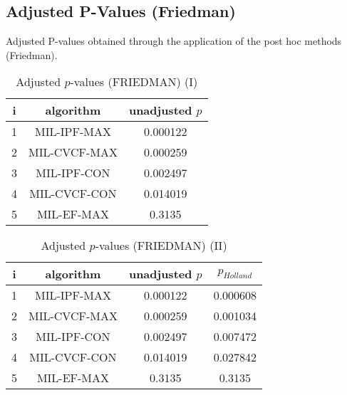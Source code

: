 \documentclass[a4paper,10pt]{article}
\begin{document}
\begin{landscape}
\newpage

\section{Adjusted P-Values (Friedman)}


Adjusted P-values obtained through the application of the post hoc methods (Friedman).

\begin{table}[!htp]
\centering\small
\begin{tabular}{ccc}
i&algorithm&unadjusted $p$\\
\hline1&MIL-IPF-MAX&0.000122\\2&MIL-CVCF-MAX&0.000259\\3&MIL-IPF-CON&0.002497\\4&MIL-CVCF-CON&0.014019\\5&MIL-EF-MAX&0.3135\\\hline
\end{tabular}
\caption{Adjusted $p$-values (FRIEDMAN) (I)}
\end{table}
\begin{table}[!htp]
\centering\small
\begin{tabular}{cccc}
i&algorithm&unadjusted $p$&$p_{Holland}$\\
\hline1&MIL-IPF-MAX&0.000122&0.000608\\2&MIL-CVCF-MAX&0.000259&0.001034\\3&MIL-IPF-CON&0.002497&0.007472\\4&MIL-CVCF-CON&0.014019&0.027842\\5&MIL-EF-MAX&0.3135&0.3135\\\hline
\end{tabular}
\caption{Adjusted $p$-values (FRIEDMAN) (II)}
\end{table}

\newpage
\end{landscape}
\end{document}
